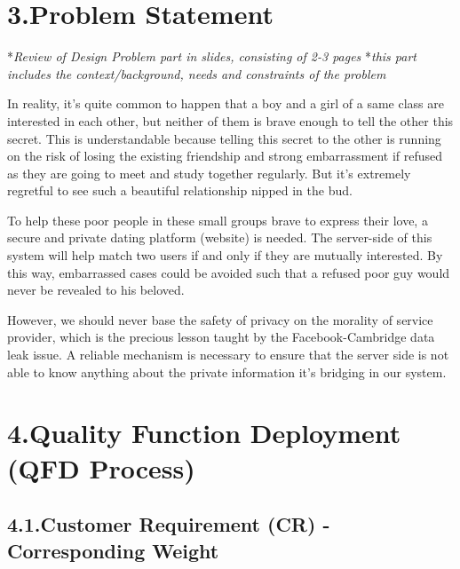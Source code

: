 \documentclass{article}
\begin{document}
\section{3.\hspace*{0.5em}Problem Statement}\label{sec-problem-statement}%

\noindent{}*\emph{Review of Design Problem part in slides, consisting of 2-3 pages}\mdbr
{}*\emph{this part includes the context/background, needs and constraints of the problem}%

In reality, it's quite common to happen that a boy and a girl of a same class are interested in each other, but neither of them is brave enough to tell the other this secret. This is understandable because telling this secret to the other is running on the risk of losing the existing friendship and strong embarrassment if refused as they are going to meet and study together regularly. But it's extremely regretful to see such a beautiful relationship nipped in the bud.%

To help these poor people in these small groups brave to express their love, a secure and private dating platform (website) is needed. The server-side of this system will help match two users if and only if they are mutually interested. By this way, embarrassed cases could be avoided such that a refused poor guy would never be revealed to his beloved.%

However, we should never base the safety of privacy on the morality of service provider, which is the precious lesson taught by the Facebook-Cambridge data leak issue. A reliable mechanism is necessary to ensure that the server side is not able to know anything about the private information it's bridging in our system.%

\section{4.\hspace*{0.5em}Quality Function Deployment (QFD Process)}\label{sec-quality-function-deployment-qfd-process}%

\subsection{4.1.\hspace*{0.5em}Customer Requirement (CR) - Corresponding Weight}\label{sec-customer-requirement-cr---corresponding-weight}%
\end{document}
